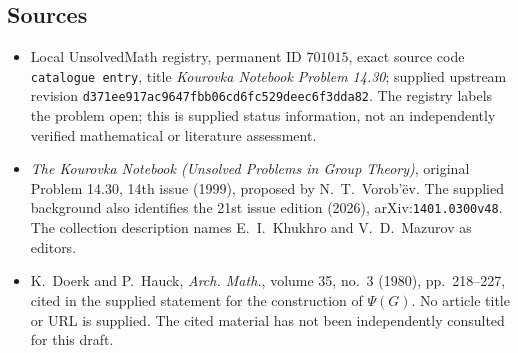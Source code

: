 \documentclass[11pt]{article}
\begin{document}
\subsection{Sources}
\begin{itemize}
\item Local UnsolvedMath registry, permanent ID \(701015\), exact source code \texttt{catalogue entry}, title \emph{Kourovka Notebook Problem 14.30}; supplied upstream revision \texttt{d371ee917ac9647fbb06cd6fc529deec6f3dda82}. The registry labels the problem open; this is supplied status information, not an independently verified mathematical or literature assessment.
\item \emph{The Kourovka Notebook (Unsolved Problems in Group Theory)}, original Problem 14.30, 14th issue (1999), proposed by N.~T.~Vorob'\"{e}v. The supplied background also identifies the 21st issue edition (2026), arXiv:\texttt{1401.0300v48}. The collection description names E.~I.~Khukhro and V.~D.~Mazurov as editors.
\item K.~Doerk and P.~Hauck, \emph{Arch. Math.}, volume 35, no.~3 (1980), pp.~218--227, cited in the supplied statement for the construction of \(\Psi(G)\). No article title or URL is supplied. The cited material has not been independently consulted for this draft.
\end{itemize}
\end{document}
